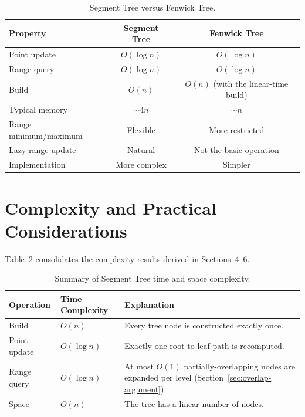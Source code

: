 \documentclass[11pt]{article}
\begin{document}
\begin{table}[h]
\centering
\caption{Segment Tree versus Fenwick Tree.}
\label{tab:comparison}
\begin{tabular}{lcc}
\toprule
\textbf{Property} & \textbf{Segment Tree} & \textbf{Fenwick Tree} \\
\midrule
Point update            & $O(\log n)$ & $O(\log n)$ \\
Range query              & $O(\log n)$ & $O(\log n)$ \\
Build                    & $O(n)$      & $O(n)$ (with the linear-time build) \\
Typical memory           & $\sim 4n$   & $\sim n$ \\
Range minimum/maximum    & Flexible    & More restricted \\
Lazy range update        & Natural     & Not the basic operation \\
Implementation           & More complex& Simpler \\
\bottomrule
\end{tabular}
\end{table}

\section{Complexity and Practical Considerations}

Table~\ref{tab:summary} consolidates the complexity results derived in Sections~4--6.

\begin{table}[h]
\centering
\caption{Summary of Segment Tree time and space complexity.}
\label{tab:summary}
\begin{tabular}{llp{6.5cm}}
\toprule
\textbf{Operation} & \textbf{Time Complexity} & \textbf{Explanation} \\
\midrule
Build         & $O(n)$      & Every tree node is constructed exactly once. \\
Point update  & $O(\log n)$ & Exactly one root-to-leaf path is recomputed. \\
Range query   & $O(\log n)$ & At most $O(1)$ partially-overlapping nodes are expanded per level (Section~\ref{sec:overlap-argument}). \\
Space         & $O(n)$      & The tree has a linear number of nodes. \\
\bottomrule
\end{tabular}
\end{table}
\end{document}
